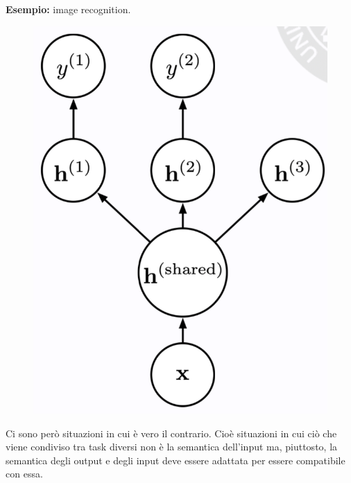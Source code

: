 \textbf{Esempio:} image recognition.
\begin{figure}[!h]
  \includegraphics[scale=.5]{images/representation_learning/image_rec.png}
  \centering
\end{figure}


Ci sono però situazioni in cui è vero il contrario. Cioè situazioni in cui ciò che viene condiviso tra 
task diversi non è la semantica dell'input ma, piuttosto, la semantica degli output e degli input deve 
essere adattata per essere compatibile con essa.



